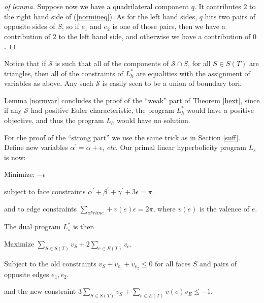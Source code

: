 \documentclass{acmart}
\newcommand{\thm}[2]{\begin{#1} #2 \end{#1}}
\begin{document}
{\begin{proof}[of lemma]
Suppose now we have a quadrilateral component $q$. It 
contributes $2$ to the right hand side of (\ref{normineq}). As for the
left hand sides, $q$ hits two pairs of opposite sides of $S$, so if
$e_1$ and $e_2$ is one of those pairs, then we have a contribution of
$2$ to the left hand side, and otherwise we have a contribution of
$0$.
\end{proof}

\thm{remark}
{
\label{rmkkk}
Notice that if $\mathcal{S}$ is such that all of the
components of $\mathcal{S} \cap S$, for all $S\in S(T)$ are triangles,
then all of the constraints of $L_h^*$ are equalities with the
assignment of variables as above. Any such $\mathcal{S}$ is easily
seen to be a union of boundary tori.
}

Lemma \ref{normvar} concludes the proof of the ``weak'' part of
Theorem \ref{hext}, since if any $\mathcal{S}$ had positive Euler
characteristic, the program $L_h^*$ would have a positive objective,
and thus the program $L_h$ would have no solution.

For the proof of the ``strong part'' we use the same trick as in
Section \ref{suff}. Define new variables $\alpha^\prime = \alpha +
\epsilon$, \textit{etc.}
Our primal linear hyperbolicity program $L_s$ is now:

\begin{description}

\item{Minimize:} $-\epsilon$

\item{subject to face constraints} $\alpha^\prime + \beta^\prime +
  \gamma^\prime + 3\epsilon = \pi.$

\item{and to edge constraints} $\sum_{\alpha^prime} + v(e) \epsilon =
  2\pi$, where $v(e)$ is the valence of $e$.
\end{description}

The dual program $L_s^*$ is then

\begin{description}
\item{Maximize} $\sum_{S\in S(T)} v_S + 2 \sum_{e \in E(T)} v_e$.

\item{Subject to the old constraints} $v_S + v_{e_1} + v_{e_2}\leq 0$
  for all faces $S$ and pairs of opposite edges $e_1, e_2$.

\item{and the new constraint} $3\sum_{S \in S(T)} v_S + \sum_{e\in
    E(T)} v(e) v_E \leq -1.$
\end{description}

}
\end{document}
